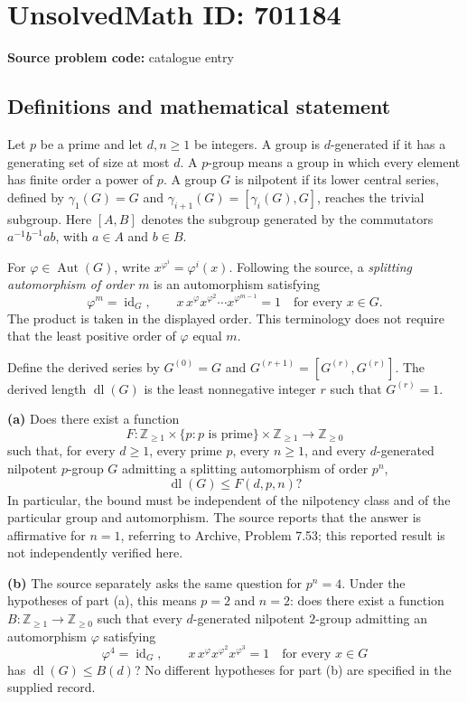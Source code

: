 \documentclass[11pt]{article}
\begin{document}
\section*{UnsolvedMath ID: 701184}
\textbf{Source problem code:} catalogue entry
\subsection{Definitions and mathematical statement}
Let \(p\) be a prime and let \(d,n\geq 1\) be integers. A group is \(d\)-generated if it has a generating set of size at most \(d\). A \(p\)-group means a group in which every element has finite order a power of \(p\). A group \(G\) is nilpotent if its lower central series, defined by \(\gamma_1(G)=G\) and \(\gamma_{i+1}(G)=[\gamma_i(G),G]\), reaches the trivial subgroup. Here \([A,B]\) denotes the subgroup generated by the commutators \(a^{-1}b^{-1}ab\), with \(a\in A\) and \(b\in B\).

For \(\varphi\in\operatorname{Aut}(G)\), write \(x^{\varphi^i}=\varphi^i(x)\). Following the source, a \emph{splitting automorphism of order \(m\)} is an automorphism satisfying
\[
\varphi^m=\operatorname{id}_G,
\qquad
x\,x^{\varphi}x^{\varphi^2}\cdots x^{\varphi^{m-1}}=1
\quad\text{for every }x\in G.
\]
The product is taken in the displayed order. This terminology does not require that the least positive order of \(\varphi\) equal \(m\).

Define the derived series by \(G^{(0)}=G\) and \(G^{(r+1)}=[G^{(r)},G^{(r)}]\). The derived length \(\operatorname{dl}(G)\) is the least nonnegative integer \(r\) such that \(G^{(r)}=1\).

\textbf{(a)} Does there exist a function
\[
F:\mathbb{Z}_{\geq1}\times\{p:p\text{ is prime}\}\times\mathbb{Z}_{\geq1}
\longrightarrow\mathbb{Z}_{\geq0}
\]
such that, for every \(d\geq1\), every prime \(p\), every \(n\geq1\), and every \(d\)-generated nilpotent \(p\)-group \(G\) admitting a splitting automorphism of order \(p^n\),
\[
\operatorname{dl}(G)\leq F(d,p,n)?
\]
In particular, the bound must be independent of the nilpotency class and of the particular group and automorphism. The source reports that the answer is affirmative for \(n=1\), referring to Archive, Problem 7.53; this reported result is not independently verified here.

\textbf{(b)} The source separately asks the same question for \(p^n=4\). Under the hypotheses of part (a), this means \(p=2\) and \(n=2\): does there exist a function \(B:\mathbb{Z}_{\geq1}\to\mathbb{Z}_{\geq0}\) such that every \(d\)-generated nilpotent \(2\)-group admitting an automorphism \(\varphi\) satisfying
\[
\varphi^4=\operatorname{id}_G,
\qquad
x\,x^{\varphi}x^{\varphi^2}x^{\varphi^3}=1
\quad\text{for every }x\in G
\]
has \(\operatorname{dl}(G)\leq B(d)\)? No different hypotheses for part (b) are specified in the supplied record.
\end{document}
